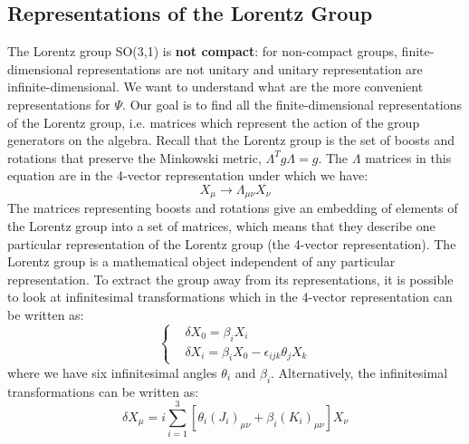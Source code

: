 \documentclass[../main.tex]{subfiles}
\begin{document}
\subsection{Representations of the Lorentz Group}
The Lorentz group SO(3,1) is \textbf{not compact}: for non-compact groups, finite-dimensional representations are not unitary and unitary representation are infinite-dimensional. We want to understand what are the more convenient representations for $\Psi$. Our goal is to find all the finite-dimensional representations of the Lorentz group, i.e. matrices which represent the action of the group generators on the algebra. Recall that the Lorentz group is the set of boosts and rotations that preserve the Minkowski metric, $\Lambda^T g\Lambda=g$. The $\Lambda$ matrices in this equation are in the 4-vector representation under which we have:
\[
X_\mu\to\Lambda_{\mu\nu}X_\nu
\]
The matrices representing boosts and rotations give an embedding of elements of the Lorentz group into a set of matrices, which means that they describe one particular representation of the Lorentz group (the 4-vector representation). The Lorentz group is a mathematical object independent of any particular representation. To extract the group away from its representations, it is possible to look at infinitesimal transformations which in the 4-vector representation can be written as:
\[
\left\{
\begin{aligned}
&\delta X_0=\beta_iX_i\\
&\delta X_i=\beta_iX_0-\epsilon_{ijk}\theta_jX_k
\end{aligned}
\right.
\]
where we have six infinitesimal angles $\theta_i$ and $\beta_i$. Alternatively, the infinitesimal transformations can be written as:
\[
\delta X_\mu=i\sum_{i=1}^3[\theta_i(J_i)_{\mu\nu}+\beta_i(K_i)_{\mu\nu}]X_\nu
\]
\end{document}
